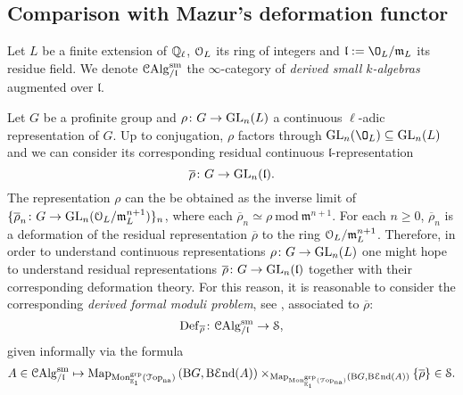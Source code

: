 \documentclass[10pt,a4paper]{amsart}
\numberwithin{equation}{subsection}
\theoremstyle{plain}
\theoremstyle{definition}
\theoremstyle{remark}
\numberwithin{equation}{section}
\begin{document}
\subsection{Comparison with Mazur's deformation functor}
Let $L$ be a finite extension of $\mathbb{Q}_{\ell}$, $\mathcal{O}_L$ its ring of integers and $\mathfrak l := \O_L / \mathfrak{m}_L$ its residue field. We denote $\mathcal{C}\mathrm{Alg}_{/ \mathfrak l}^{\mathrm{sm}}$ the $\infty$-category of \emph{derived small $k$-algebras} augmented over $
\mathfrak l$.

Let $G$ be a profinite group and $\rho \colon G \to \mathrm{GL}_n(L)$ a continuous $\ell$-adic representation of $G$. Up to conjugation, $\rho$ factors through $\GLn(\O_L ) \subseteq \GLn(L)$ and we can consider its corresponding
residual continuous $\mathfrak l$-representation
	\[
		\overline{\rho} \colon G \to \mathrm{GL}_n(\mathfrak l).
	\]
The representation $\rho$ can the be obtained as the inverse limit of $\{ \overline{\rho}_n \colon G \to \mathrm{GL}_n(\mathcal{O}_L / \mathfrak{m}_L^{n+1}) \}_n$, where each $\overline{\rho}_n \simeq \rho \ \mathrm{mod } \ \mathfrak{m}^{n+1}$. For each $n \geq 0$,
$\overline{\rho}_n $ is a deformation of the residual representation $\overline{\rho}$ to the ring $\mathcal{O}_L / \mathfrak m_L^{n+1}$.
Therefore, in order to understand continuous representations $\rho \colon G \to \mathrm{GL}_n(L)$ one might hope to understand residual representations $\overline{\rho} \colon G \to \mathrm{GL}_n(\mathfrak l)$ together with their corresponding
deformation theory. For this reason,
it is reasonable to consider the corresponding \emph{derived formal moduli problem}, see \cite[Definition 12.1.3.1]{lurieSAG}, associated to $\overline{\rho}$:
	\[
		\mathbf{\mathrm{Def}}_{\overline{\rho}} \colon \mathcal{C}\mathrm{Alg}^{\mathrm{sm}}_{/ \mathfrak l} \to \mathcal S,
	\]
given informally via the formula
	\begin{equation} \label{deform}
		A \in \mathcal{C}\mathrm{Alg}^{\mathrm{sm}}_{/ \mathfrak l} \mapsto \mathrm{Map}_{\mathrm{Mon}^{\mathrm{grp}}_{\mathbb E_1} \left( \mathcal{T} \mathrm{op}_{\mathrm{na}} \right)} 	 \left( \mathrm B G, \mathrm{B} \mathcal E \mathrm{nd}(A) \right) \times_{ \mathrm{Map}_{\mathrm{Mon}^{\mathrm{grp}}_{\mathbb E_1}(\mathcal{T} \mathrm{op}_{\mathrm{na}})} \left( \mathrm B G,
		\mathrm{B} \mathcal E \mathrm{nd}(A) \right) } \{ \overline{\rho} \} \in \mathcal S
		.
	\end{equation}
\end{document}

